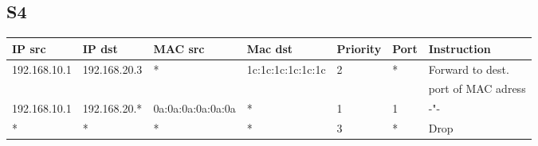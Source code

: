 \documentclass{article}
\begin{document}
\begin{adjustwidth}{2em}{2em}
		\subsection*{S4}
		\begin{adjustwidth}{-4em}{}
			\begin{tabular}{|l|l|l|l|l|l|l|}
				\hline
				IP src & IP dst & MAC src & Mac dst & Priority & Port & Instruction \\
				\hline
				192.168.10.1 & 192.168.20.3 & * & 1c:1c:1c:1c:1c:1c & 2 & * & Forward to dest. \\ 
				& & & & & & port of MAC adress \\
				\hline
				192.168.10.1 & 192.168.20.* & 0a:0a:0a:0a:0a:0a & * & 1 & 1 & -"- \\
				\hline
				\* * & * & * & * & 3 & * & Drop \\
				\hline
			\end{tabular}
		\end{adjustwidth}
	\end{adjustwidth}
\end{document}
